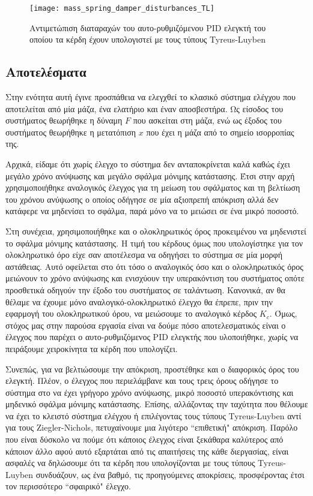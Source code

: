 \begin{figure}[h]
  \centering
  \texttt{[image: mass\_spring\_damper\_disturbances\_TL]}
  \caption{Αντιμετώπιση διαταραχών του αυτο-ρυθμιζόμενου PID ελεγκτή του οποίου τα κέρδη έχουν υπολογιστεί με τους τύπους Tyreus-Luyben}
  \label{fig:mass_spring_damper_disturbances_TL}
\end{figure}

\subsection{Αποτελέσματα}

Στην ενότητα αυτή έγινε προσπάθεια να ελεγχθεί το κλασικό σύστημα ελέγχου που αποτελείται από μία μάζα, ένα ελατήριο και έναν αποσβεστήρα. Ως είσοδος του συστήματος θεωρήθηκε η δύναμη $F$ που ασκείται στη μάζα, ενώ ως έξοδος του συστήματος θεωρήθηκε η μετατόπιση $x$ που έχει η μάζα από το σημείο ισορροπίας της. 

Αρχικά, είδαμε ότι χωρίς έλεγχο το σύστημα δεν ανταποκρίνεται καλά καθώς έχει μεγάλο χρόνο ανύψωσης και μεγάλο σφάλμα μόνιμης κατάστασης. Έτσι στην αρχή χρησιμοποιήθηκε αναλογικός έλεγχος για τη μείωση του σφάλματος και τη βελτίωση του χρόνου ανύψωσης ο οποίος οδήγησε σε μία αξιοπρεπή απόκριση αλλά δεν κατάφερε να μηδενίσει το σφάλμα, παρά μόνο να το μειώσει σε ένα μικρό ποσοστό. 

Στη συνέχεια, χρησιμοποιήθηκε και ο ολοκληρωτικός όρος προκειμένου να μηδενιστεί το σφάλμα μόνιμης κατάστασης. Η τιμή του κέρδους όμως που υπολογίστηκε για τον ολοκληρωτικό όρο είχε σαν αποτέλεσμα να οδηγήσει το σύστημα σε μία μορφή αστάθειας. Αυτό οφείλεται στο ότι τόσο ο αναλογικός όσο και ο ολοκληρωτικός όρος μειώνουν το χρόνο ανύψωσης και ενισχύουν την υπερακόντιση του συστήματος οπότε προσθετικά οδηγούν την έξοδο του συστήματος σε ταλάντωση. Κανονικά, αν θα θέλαμε να έχουμε μόνο αναλογικό-ολοκληρωτικό έλεγχο θα έπρεπε, πριν την εφαρμογή του ολοκληρωτικού όρου, να μειώσουμε το αναλογικό κέρδος $K_c$. Όμως, στόχος μας στην παρούσα εργασία είναι να δούμε πόσο αποτελεσματικός είναι ο έλεγχος που παρέχει ο αυτο-ρυθμιζόμενος PID ελεγκτής που υλοποιήθηκε, χωρίς να πειράξουμε χειροκίνητα τα κέρδη που υπολογίζει.

Συνεπώς, για να βελτιώσουμε την απόκριση, προστέθηκε και ο διαφορικός όρος του ελεγκτή. Πλέον, ο έλεγχος που περιελάμβανε και τους τρεις όρους οδήγησε το σύστημα στο να έχει γρήγορο χρόνο ανύψωσης, μικρό ποσοστό υπερακόντισης και μηδενικό σφάλμα μόνιμης κατάστασης. Επίσης, αλλάζοντας την ταχύτητα που θέλουμε να έχει το κλειστό σύστημα ελέγχου ή επιλέγοντας τους τύπους Tyreus-Luyben αντί για τους Ziegler-Nichols, πετυχαίνουμε μια λιγότερο ``επιθετική" απόκριση. Παρόλο που είναι δύσκολο να πούμε ότι κάποιος έλεγχος είναι ξεκάθαρα καλύτερος από κάποιον άλλο αφού αυτό εξαρτάται από τις απαιτήσεις της κάθε διεργασίας, είναι ασφαλές να δηλώσουμε ότι τα κέρδη που υπολογίζονται με τους τύπους Tyreus-Luyben συνδυάζουν, ως ένα βαθμό, τις προηγούμενες αποκρίσεις, προσφέροντας έτσι τον περισσότερο ``σφαιρικό" έλεγχο.

